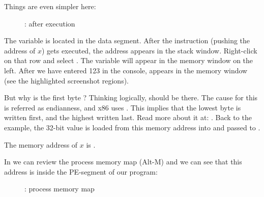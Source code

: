\clearpage
{}
\myindex{\olly}

Things are even simpler here:

\begin{figure}[H]
\centering
{}
\caption{\olly: after \scanf execution}
\label{fig:scanf_ex2_olly_1}
\end{figure}

The variable is located in the data segment.
After the \PUSH instruction (pushing the address of $x$) gets executed, 
the address appears in the stack window. Right-click on that row and select .
The variable will appear in the memory window on the left.
After we have entered 123 in the console, 
 appears in the memory window (see the highlighted screenshot regions).

But why is the first byte ?
Thinking logically,  should be
there.
The cause for this is referred as  \gls{endianness}, and x86 uses .
This implies that the lowest byte is written first, and the highest written last.
Read more about it at: .
Back to the example, the 32-bit value is loaded from this memory address into \EAX and passed to \printf.

The memory address of $x$ is .

\clearpage
In \olly we can review the process memory map (Alt-M)
and we can see that this address is inside the  PE-segment of our program:

\begin{figure}[H]
\centering
{}
\caption{\olly: process memory map}
\label{fig:scanf_ex2_olly_2}
\end{figure}

